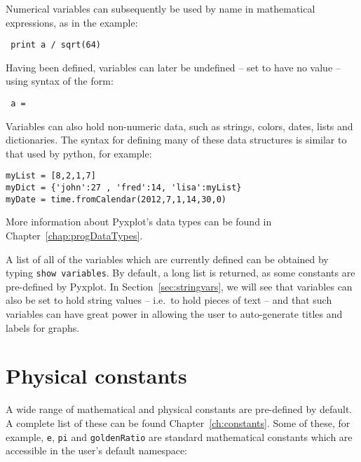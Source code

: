 \noindent Numerical variables can subsequently be used by name in mathematical
expressions, as in the example:

\begin{verbatim} print a / sqrt(64) \end{verbatim}

\noindent Having been defined, variables can later be undefined -- set to have
no value -- using syntax of the form:

\begin{verbatim} a = \end{verbatim}

Variables can also hold non-numeric data, such as strings, colors, dates, lists and dictionaries. The syntax for defining many of these data structures is similar to that used by python, for example:

\begin{verbatim}
myList = [8,2,1,7]
myDict = {'john':27 , 'fred':14, 'lisa':myList}
myDate = time.fromCalendar(2012,7,1,14,30,0)
\end{verbatim}

\noindent More information about Pyxplot's data types can be found in Chapter~\ref{chap:progDataTypes}.

A list of all of the variables which are currently defined can be obtained by
typing {\tt show variables}. By default, a long
list is returned, as some constants are pre-defined by Pyxplot. In
Section~\ref{sec:stringvars}, we will see that variables can also be set to
hold string values -- i.e.\ to hold pieces of text -- and that such variables
can have great power in allowing the user to auto-generate titles and labels
for graphs.

\section{Physical constants} \label{sec:constants} 

A wide range of mathematical and physical constants are pre-defined by default.
A complete list of these can be found Chapter~\ref{ch:constants}.  Some of
these, for example, {\tt e}, {\tt pi} and {\tt goldenRatio} are standard
mathematical constants which are accessible in the user's default namespace:

\vspace{3mm}

\vspace{3mm}

